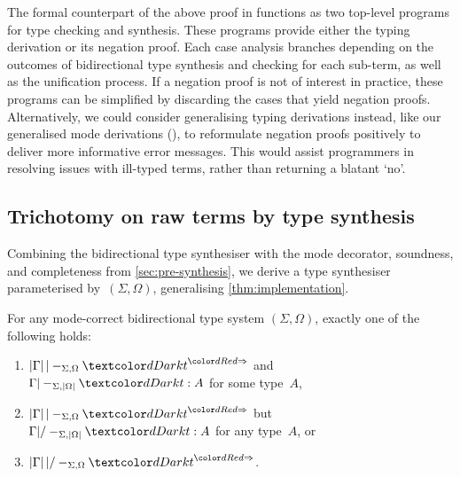 The formal counterpart of the above proof in \Agda functions as two top-level programs for type checking and synthesis.
These programs provide either the typing derivation or its negation proof.
Each case analysis branches depending on the outcomes of bidirectional type synthesis and checking for each sub-term, as well as the unification process.
If a negation proof is not of interest in practice, these programs can be simplified by discarding the cases that yield negation proofs.
Alternatively, we could consider generalising typing derivations instead, like our generalised mode derivations (), to reformulate negation proofs positively to deliver more informative error messages.
This would assist programmers in resolving issues with ill-typed terms, rather than returning a blatant `no'.

\subsection{Trichotomy on raw terms by type synthesis} \label{subsec:trichotomy}

Combining the bidirectional type synthesiser with the mode decorator, soundness, and completeness from \cref{sec:pre-synthesis}, we derive a type synthesiser parameterised by~$(\Sigma, \Omega)$, generalising \cref{thm:implementation}.

\begin{corollary}\label{cor:trichotomy}
  For any mode-correct bidirectional type system $(\Sigma, \Omega)$, 
  exactly one of the following holds:
  \begin{enumerate}
    \item $\erase{\Gamma} |-_{\Sigma, \Omega} \isTerm{t}^{\syn}$ and $\Gamma |-_{\Sigma, \erase{\Omega}} \isTerm{t} : A$ for some type~$A$,
    \item $\erase{\Gamma} |-_{\Sigma, \Omega} \isTerm{t}^{\syn}$ but $\Gamma |/-_{\Sigma, \erase{\Omega}} \isTerm{t} : A$ for any type~$A$, or 
    \item $\erase{\Gamma} |/-_{\Sigma, \Omega} \isTerm{t}^{\syn}$.
  \end{enumerate}
\end{corollary}
